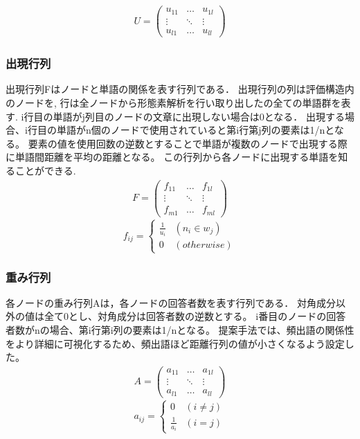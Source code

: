 \documentclass[syuuron]{kuee}
\begin{document}
				\begin{eqnarray}
				 U = \left(
				    \begin{array}{cccc}
				    	u_{11} & \ldots & u_{1l} \\
				    	\vdots & \ddots & \vdots \\
				    	u_{l1} & \ldots & u_{ll}
					\end{array}
				 \right)
				\end{eqnarray}	
		
			\subsubsection{出現行列}
				出現行列Fはノードと単語の関係を表す行列である．
				出現行列の列は評価構造内のノードを, 行は全ノードから形態素解析を行い取り出したの全ての単語群を表す. 
				i行目の単語がj列目のノードの文章に出現しない場合は0となる．
				出現する場合、i行目の単語がn個のノードで使用されていると第i行第j列の要素は1/nとなる。
				要素の値を使用回数の逆数とすることで単語が複数のノードで出現する際に単語間距離を平均の距離となる。
				この行列から各ノードに出現する単語を知ることができる. 
				\begin{eqnarray}
				 F = \left(
				    \begin{array}{cccc}
				    	f_{11} & \ldots & f_{1l} \\
				    	\vdots & \ddots & \vdots \\
				    	f_{m1} & \ldots & f_{ml}
					\end{array}
				 \right)
				\end{eqnarray}	
				\[
				  f_{ij} = \left\{ \begin{array}{ll}
				    \frac{1}{u_i} & (n_i \in w_j) \\
				    0 & (otherwise)
				  \end{array} \right.
				\]
				
			\subsubsection{重み行列}
				各ノードの重み行列Aは，各ノードの回答者数を表す行列である．
				対角成分以外の値は全て0とし、対角成分は回答者数の逆数とする。
				i番目のノードの回答者数がnの場合、第i行第i列の要素は1/nとなる。
				提案手法では、頻出語の関係性をより詳細に可視化するため、頻出語ほど距離行列の値が小さくなるよう設定した。
				\begin{eqnarray}
				 A = \left(
				    \begin{array}{cccc}
				    	a_{11} & \ldots & a_{1l} \\
				    	\vdots & \ddots & \vdots \\
				    	a_{l1} & \ldots & a_{ll}
					\end{array}
				 \right)
				\end{eqnarray}
				\[
				  a_{ij} = \left\{ \begin{array}{ll}
				     0 & (i ≠ j) \\
				     \frac{1}{a_i} & (i = j)
				  \end{array} \right.
				\]
				
\end{document}
